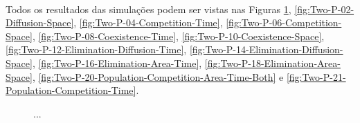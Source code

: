 \documentclass{article}
\begin{document}
	\paragraph{}
	Todos os resultados das simulações podem ser vistas nas Figuras \ref{fig:Two-P-00-Diffusion-Time}, \ref{fig:Two-P-02-Diffusion-Space}, \ref{fig:Two-P-04-Competition-Time}, \ref{fig:Two-P-06-Competition-Space}, \ref{fig:Two-P-08-Coexistence-Time}, \ref{fig:Two-P-10-Coexistence-Space}, \ref{fig:Two-P-12-Elimination-Diffusion-Time}, \ref{fig:Two-P-14-Elimination-Diffusion-Space}, \ref{fig:Two-P-16-Elimination-Area-Time}, \ref{fig:Two-P-18-Elimination-Area-Space}, \ref{fig:Two-P-20-Population-Competition-Area-Time-Both} e \ref{fig:Two-P-21-Population-Competition-Time}.
	
	\begin{figure}[h]
		\centering
		\qquad
		\caption{...}
		\label{fig:Two-P-00-Diffusion-Time}
	\end{figure}	
\end{document}
